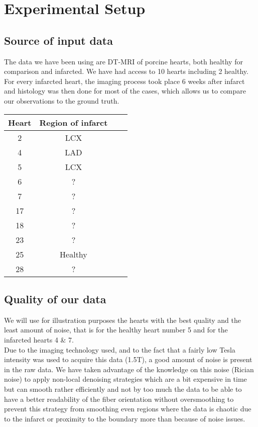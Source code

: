 \chapter{Experimental Setup}

\section{Source of input data}

The data we have been using are DT-MRI of porcine hearts, both healthy for comparison and infarcted. We have had access to 10 hearts including 2 healthy. For every infarcted heart, the imaging process took place 6 weeks after infarct and histology was then done for most of the cases, which allows us to compare our observations to the ground truth.

\begin{center}
 \begin{tabular}{|c | c | c | c|} 
 \hline
 Heart & Region of infarct \\
 \hline
 2 & LCX \\ 
 \hline
 4 & LAD \\
 \hline
 5 & LCX \\
 \hline
 6 & ? \\
 \hline
 7 & ? \\ 
 \hline
 17 & ? \\
 \hline
 18 & ? \\
 \hline
 23 & ? \\
 \hline
 25 & Healthy \\
 \hline
 28 & ? \\
 \hline
\end{tabular}
\end{center}

\section{Quality of our data}

We will use for illustration purposes the hearts with the best quality and the least amount of noise, that is for the healthy heart number 5 and for the infarcted hearts 4 \& 7. \\
Due to the imaging technology used, and to the fact that a fairly low Tesla intensity was used to acquire this data (1.5T), a good amount of noise is present in the raw data. We have taken advantage of the knowledge on this noise (Rician noise) to apply non-local denoising strategies which are a bit expensive in time but can smooth rather efficiently and not by too much the data to be able to have a better readability of the fiber orientation without oversmoothing to prevent this strategy from smoothing even regions where the data is chaotic due to the infarct or proximity to the boundary more than because of noise issues.

